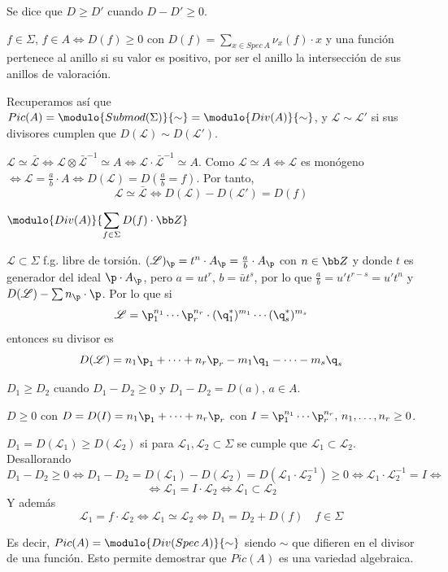     Se dice que $D\ge D'$ cuando $D-D'\ge 0$. 

    $f \in \Sigma, \, f\in A \iff D(f) \ge 0$ con $D(f)  = \displaystyle \sum_{x\in Spec\, A} \nu_x(f) \cdot x$ y una funci\'on pertenece al anillo si su valor es positivo, por ser el anillo la intersecci\'on de sus anillos de valoraci\'on. 

    Recuperamos as\'i que $Pic(A) = \modulo{Submod(\Sigma)}{\sim} = \modulo{Div(A)}{\sim}$, y $\mathscr L \sim \mathscr L'$ si sus divisores cumplen que $D(\mathscr L) \sim D(\mathscr L')$. 

    \begin{dem}
        $\mathscr L\simeq \bar{\mathscr L} \iff \mathscr L\otimes \bar{\mathscr L}^{-1} \simeq A \iff \mathscr L \cdot \bar{\mathscr L}^{-1} \simeq A$. Como $\mathscr L \simeq A \iff \mathscr L$ es mon\'ogeno $\iff \mathscr L = \frac{a}{b} \cdot A \iff D(\mathscr L) = D(\frac{a}{b}=f)$. Por tanto, 
        $$\mathscr L \simeq \bar{\mathscr L} \iff D(\mathscr L) - D(\mathscr L' ) = D(f)$$
    \end{dem}
    \begin{cor}
        $\modulo{Div(A)}{\displaystyle \sum_{f\in \Sigma} D(f)\cdot \bb Z}$
    \end{cor}
    \begin{obs}
        $\mathscr L \subset \Sigma$ f.g. libre de torsi\'on. $(\mathscr L)_\p = t^n \cdot A_\p = \frac{a}{b} \cdot A_\p$ con $n \in \bb Z$ y donde $t$ es generador del ideal $\p \cdot A_\p$, pero $a=ut^r, \, b=\bar u t^s$, por lo que $\frac{a}{b} = u' t^{r-s}=u' t^n$ y $D(\mathscr L) - \sum n_\p \cdot \p$. Por lo que si
        $$\mathscr L = \p_1^{n_1} \cdots \p_r^{n_r} \cdot (\q_1^*)^{m_1} \cdots (\q_s^*)^{m_s} $$ 
        entonces su divisor es
        $$D(\mathscr L) = n_1 \p_1 + \cdots + n_r \p_r - m_1 \q_1 - \cdots - m_s \q_s $$
    \end{obs}
    \begin{defi} 
        $D_1 \ge D_2$ cuando $D_1-D_2 \ge 0$ y $D_1 - D_2 = D(a), \, a\in A$. 

        $D\ge 0$ con $D=D(I)=n_1 \p_1 + \cdots + n_r \p_r $ con $I=\p_1^{n_1} \cdots \p_r^{n_r}, \, n_1, \ldots, n_r \ge 0$.

        $D_1 = D(\mathscr L_1) \ge D(\mathscr L_2)$ si para $\mathscr L_1, \mathscr L_2\subset \Sigma$ se cumple que $\mathscr L_1 \subset \mathscr L_2$. Desallorando
        $$D_1-D_2 \ge 0 \iff D_1-D_2 = D(\mathscr L_1) - D(\mathscr L_2) = D(\mathscr L_1 \cdot \mathscr L_2^{-1}) \ge 0 \iff \mathscr L_1 \cdot \mathscr L_2^{-1} =I \iff$$
        $$\iff \mathscr L_1 = I\cdot \mathscr L_2 \iff \mathscr L_1 \subset \mathscr L_2$$ 
        Y adem\'as 
        $$\mathscr L_1 = f\cdot \mathscr L_2 \iff \boxed{\mathscr L_1 \simeq \mathscr L_2 \iff D_1 = D_2 + D(f)} \quad f\in \Sigma$$

        Es decir, $Pic(A) = \modulo{Div(Spec\, A)}{\sim}$ siendo $\sim$ que difieren en el divisor de una funci\'on. Esto permite demostrar que $Pic(A)$ es una variedad algebraica. 
    \end{defi}
